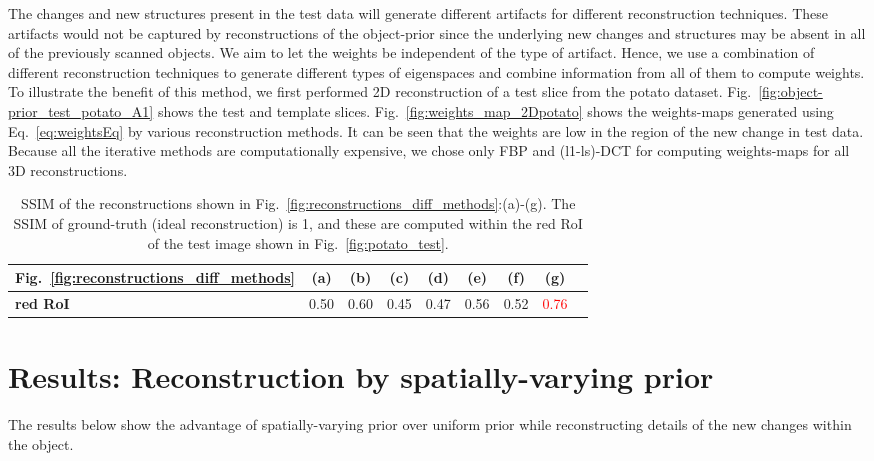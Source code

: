\documentclass[journal]{IEEEtran}
\begin{document}
The changes and new structures present in the test data will generate
different artifacts for different reconstruction techniques. These
artifacts would not be captured by reconstructions of the object-prior
since the underlying new changes and structures may be absent in all
of the previously scanned objects. We aim to let the weights be
independent of the type of artifact. Hence, we use a combination of
different reconstruction techniques to generate different types of
eigenspaces and combine information from all of them to compute
weights. To illustrate the benefit of this method, we first performed
2D reconstruction of a test slice from the potato dataset.
Fig.~\ref{fig:object-prior_test_potato_A1} shows the test and template
slices. Fig.~\ref{fig:weights_map_2Dpotato} shows the weights-maps
generated using Eq.~\ref{eq:weightsEq} by various reconstruction
methods. It can be seen that the weights are low in the region of the
new change in test data. Because all the iterative methods are
computationally expensive, we chose only FBP and (l1-ls)-DCT for
computing weights-maps for all 3D reconstructions.
\begin{table}[!h]
  \centering
\caption{SSIM of the reconstructions shown in Fig.~\ref{fig:reconstructions_diff_methods}:(a)-(g). The SSIM of ground-truth (ideal reconstruction) is 1, and these are computed within the red RoI of the test image shown in Fig.~\ref{fig:potato_test}.}
\begin{tabular}{|l|c|c|c|c|c|c|c|c|}
\hline
 Fig.~\ref{fig:reconstructions_diff_methods}  & \textbf{(a)} & \textbf{(b)} & \textbf{(c)} & \textbf{(d)} & \textbf{(e)} & \textbf{(f)} &  \textbf{(g)} \\\hline
\textbf{red RoI}  & 0.50 & 0.60  & 0.45 & 0.47 & 0.56 & 0.52 & \textcolor{red}{0.76} \\ \hline
\end{tabular}
\label{table:potato_2D_ssim}
\end{table}

\section{Results: Reconstruction by spatially-varying prior}
\label{sec:results_spatially_varying_prior}

The results below show the advantage of spatially-varying prior over uniform prior while reconstructing details of the new changes within the object.
\end{document}
